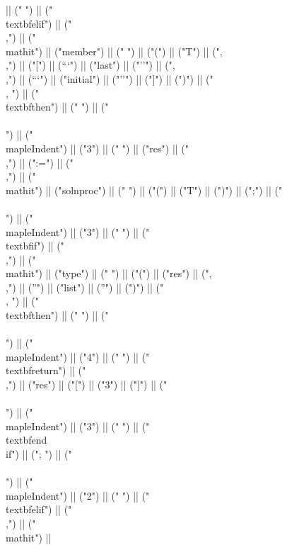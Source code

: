 \documentclass{article}
\begin{document}
\begin{center}
\begin{maplelatex}
{|| ("} ") || ("\\textbf{elif}") || (" \\,") || ("\\mathit{") || ("member") || ("} ") || ("(") || ("T") || (",\\,") || ("[") || ("``") || ("last") || ("''") || (",\\,") || ("``") || ("initial") || ("''") || ("]") || (")") || (" \\, ") || ("\\textbf{then}") || (" ") || ("\\\\\n") || ("\\mapleIndent{") || ("3") || ("} ") || ("res") || ("\\,") || (":=") || ("\\,") || ("\\mathit{") || ("solnproc") || ("} ") || ("(") || ("T") || (")") || (";") || ("\\\\\n") || ("\\mapleIndent{") || ("3") || ("} ") || ("\\textbf{if}") || (" \\,") || ("\\mathit{") || ("type") || ("} ") || ("(") || ("res") || (",\\,") || ("'") || ("list") || ("'") || (")") || (" \\, ") || ("\\textbf{then}") || (" ") || ("\\\\\n") || ("\\mapleIndent{") || ("4") || ("} ") || ("\\textbf{return}") || ("\\,") || ("res") || ("[") || ("3") || ("]") || ("\\\\\n") || ("\\mapleIndent{") || ("3") || ("} ") || ("\\textbf{end\\ if}") || ("; ") || ("\\\\\n") || ("\\mapleIndent{") || ("2") || ("} ") || ("\\textbf{elif}") || (" \\,") || ("\\mathit{") || }
\end{maplelatex}
\end{center}
\end{document}
